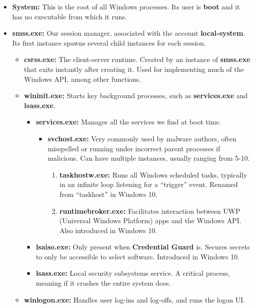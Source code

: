\documentclass{article}
\begin{document}
\begin{itemize}
    \item{\textbf{System:} This is the root of all Windows processes. Its user is \textbf{boot} and it has no executable from which it runs.}
    \item{\textbf{smss.exe:} Our session manager, associated with the account \textbf{local-system}. Its first instance spawns several child instances for each session.}
    \begin{itemize}
        \item{\textbf{csrss.exe:} The client-server runtime. Created by an instance of \textbf{smss.exe} that exits instantly after creating it. Used for implementing much of the Windows API, among other functions.}
        \item{\textbf{wininit.exe:} Starts key background processes, such as \textbf{services.exe} and \textbf{lsass.exe}.}
        \begin{itemize}
            \item{\textbf{services.exe:} Manages all the services we find at boot time.}
            \begin{itemize}
                \item{\textbf{svchost.exe:} Very commonly used by malware authors, often misspelled or running under incorrect parent processes if malicious. Can have multiple instances, usually ranging from 5-10.}
                \begin{enumerate}
                    \item{\textbf{taskhostw.exe:} Runs all Windows scheduled tasks, typically in an infinite loop listening for a ``trigger'' event. Renamed from ``taskhost'' in Windows 10.}
                    \item{\textbf{runtimebroker.exe:} Facilitates interaction between UWP (Universal Windows Platform) apps and the Windows API. Also introduced in Windows 10.}
                \end{enumerate}
            \end{itemize}
            \item{\textbf{lsaiso.exe:} Only present when \textbf{Credential Guard} is. Secures secrets to only be accessible to select software. Introduced in Windows 10.}
            \item{\textbf{lsass.exe:} Local security subsystems service. A critical process, meaning if it crashes the entire system does.}
        \end{itemize}
        \item{\textbf{winlogon.exe:} Handles user log-ins and log-offs, and runs the logon UI.}

\end{itemize}
\end{itemize}
\end{document}
